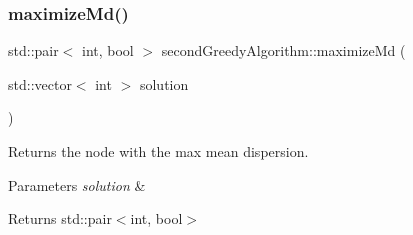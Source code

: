 \subsubsection{\texorpdfstring{maximize\+Md()}{maximizeMd()}}
{\footnotesize\ttfamily std\+::pair$<$ int, bool $>$ second\+Greedy\+Algorithm\+::maximize\+Md (\begin{DoxyParamCaption}\item[{std\+::vector$<$ int $>$}]{solution }\end{DoxyParamCaption})}



Returns the node with the max mean dispersion. 


\begin{DoxyParams}{Parameters}
{\em solution} & \\
\hline
\end{DoxyParams}
\begin{DoxyReturn}{Returns}
std\+::pair$<$int, bool$>$ 
\end{DoxyReturn}

